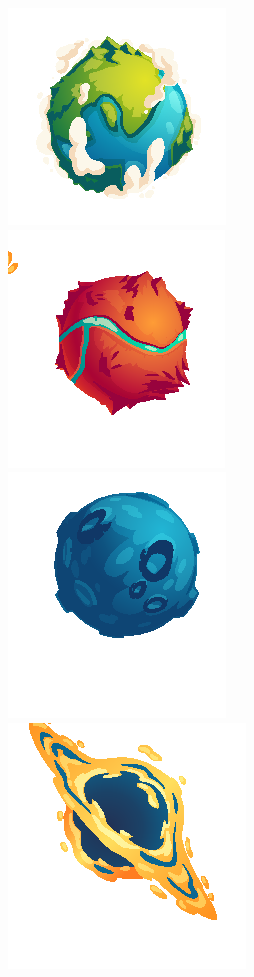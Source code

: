 \documentclass{mathos}
\begin{document}
\begin{figure}[H]
    \centering
    \includegraphics[scale=0.5]{Slike/earth.png}
    \includegraphics[scale=0.5]{Slike/red.png}
    \includegraphics[scale=0.5]{Slike/planet.png}
    \includegraphics[scale=0.5]{Slike/smth.png}

\end{figure}
\end{document}
